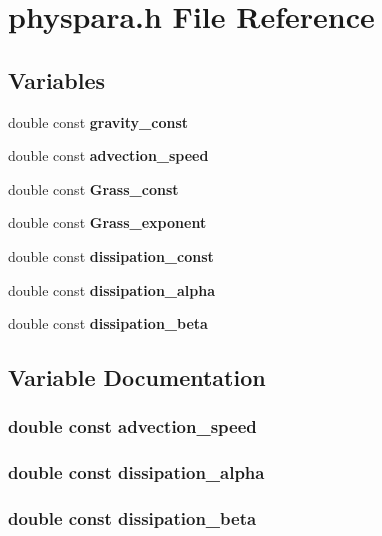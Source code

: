 \section{physpara.\-h File Reference}
\label{physpara_8h}
\subsection*{Variables}
\begin{DoxyCompactItemize}
\item 
double const {\bf gravity\-\_\-const}
\item 
double const {\bf advection\-\_\-speed}
\item 
double const {\bf Grass\-\_\-const}
\item 
double const {\bf Grass\-\_\-exponent}
\item 
double const {\bf dissipation\-\_\-const}
\item 
double const {\bf dissipation\-\_\-alpha}
\item 
double const {\bf dissipation\-\_\-beta}
\end{DoxyCompactItemize}


\subsection{Variable Documentation}
\subsubsection[{advection\-\_\-speed}]{\setlength{\rightskip}{0pt plus 5cm}double const advection\-\_\-speed}\label{physpara_8h_a0e52074011cf7b3d4fa8c85dd2461da7}
\subsubsection[{dissipation\-\_\-alpha}]{\setlength{\rightskip}{0pt plus 5cm}double const dissipation\-\_\-alpha}\label{physpara_8h_a8d455aa4610efb513713db3bbf886208}
\subsubsection[{dissipation\-\_\-beta}]{\setlength{\rightskip}{0pt plus 5cm}double const dissipation\-\_\-beta}\label{physpara_8h_a752e3f9cf5ef0011b3db5475a9f7f8bf}
